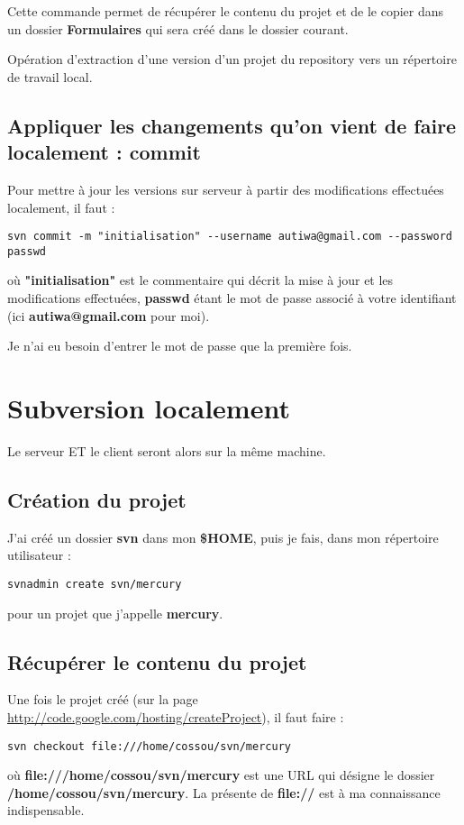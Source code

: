 \documentclass[a4paper,twoside]{article}
\begin{document}
Cette commande permet de récupérer le contenu du projet et de le copier dans un dossier \textbf{Formulaires} qui sera créé dans le dossier courant.

\begin{definition}[Checkout]
Opération d'extraction d'une version d'un projet du repository vers un répertoire de travail local.
\end{definition}


\subsection{Appliquer les changements qu'on vient de faire localement : commit}\label{sec:commit}

Pour mettre à jour les versions sur serveur à partir des modifications effectuées localement, il faut : 
\begin{verbatim}
svn commit -m "initialisation" --username autiwa@gmail.com --password passwd
\end{verbatim}
où \textbf{"initialisation"} est le commentaire qui décrit la mise à jour et les modifications effectuées, \textbf{passwd} étant le mot de passe associé à votre identifiant (ici \textbf{autiwa@gmail.com} pour moi).

\begin{remarque}
Je n'ai eu besoin d'entrer le mot de passe que la première fois.
\end{remarque}

\section{Subversion localement}
Le serveur ET le client seront alors sur la même machine.

\subsection{Création du projet}
J'ai créé un dossier \textbf{svn} dans mon \textbf{\$HOME}, puis je fais, dans mon répertoire utilisateur : 
\begin{verbatim}
svnadmin create svn/mercury
\end{verbatim}
pour un projet que j'appelle \textbf{mercury}.

\subsection{Récupérer le contenu du projet}
Une fois le projet créé (sur la page \url{http://code.google.com/hosting/createProject}), il faut faire : 
\begin{verbatim}
svn checkout file:///home/cossou/svn/mercury
\end{verbatim}
où \textbf{file:///home/cossou/svn/mercury} est une URL qui désigne le dossier \textbf{/home/cossou/svn/mercury}. La présente de \textbf{file://} est à ma connaissance indispensable.
\end{document}
